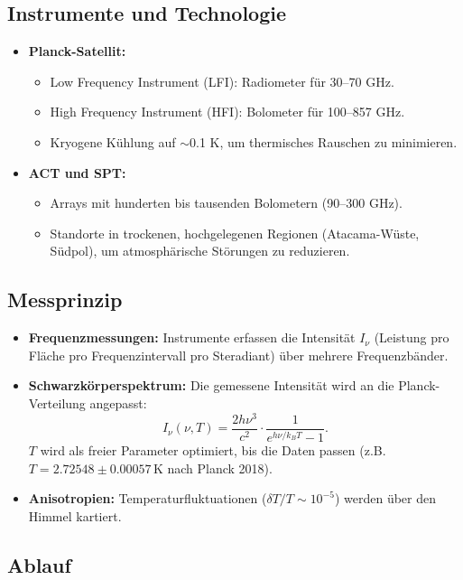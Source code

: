 \documentclass[a4paper,12pt]{article}
\theoremstyle{definition}
\theoremstyle{remark}
\begin{document}
\subsection{Instrumente und Technologie}

\begin{itemize}
	\item \textbf{Planck-Satellit:}
	\begin{itemize}
		\item Low Frequency Instrument (LFI): Radiometer für 30–70 GHz.
		\item High Frequency Instrument (HFI): Bolometer für 100–857 GHz.
		\item Kryogene Kühlung auf $\sim$0.1 K, um thermisches Rauschen zu minimieren.
	\end{itemize}
	\item \textbf{ACT und SPT:}
	\begin{itemize}
		\item Arrays mit hunderten bis tausenden Bolometern (90–300 GHz).
		\item Standorte in trockenen, hochgelegenen Regionen (Atacama-Wüste, Südpol), um atmosphärische Störungen zu reduzieren.
	\end{itemize}
\end{itemize}

\subsection{Messprinzip}

\begin{itemize}
	\item \textbf{Frequenzmessungen:} Instrumente erfassen die Intensität $I_\nu$ (Leistung pro Fläche pro Frequenzintervall pro Steradiant) über mehrere Frequenzbänder.
	\item \textbf{Schwarzkörperspektrum:} Die gemessene Intensität wird an die Planck-Verteilung angepasst:
	\[
	I_\nu(\nu, T) = \frac{2 h \nu^3}{c^2} \cdot \frac{1}{e^{h \nu / k_B T} - 1}.
	\]
	$T$ wird als freier Parameter optimiert, bis die Daten passen (z.B. $T = 2.72548 \pm 0.00057 \, \text{K}$ nach Planck 2018).
	\item \textbf{Anisotropien:} Temperaturfluktuationen ($\delta T/T \sim 10^{-5}$) werden über den Himmel kartiert.
\end{itemize}

\subsection{Ablauf}
\end{document}
